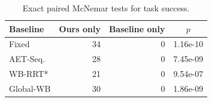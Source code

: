 \begin{table}[t]
\centering
\caption{Exact paired McNemar tests for task success.}
\label{tab:mcnemar}
\begin{tabular}{lrrc}
\toprule
Baseline & Ours only & Baseline only & $p$ \\
\midrule
Fixed & 34 & 0 & 1.16e-10 \\
AET-Seq. & 28 & 0 & 7.45e-09 \\
WB-RRT* & 21 & 0 & 9.54e-07 \\
Global-WB & 30 & 0 & 1.86e-09 \\
\bottomrule
\end{tabular}
\end{table}
